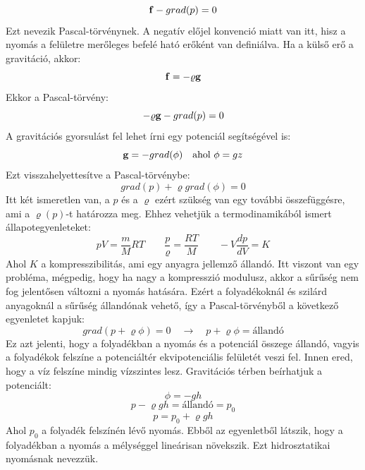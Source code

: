 \documentclass[a4paper,12pt]{article}
\begin{document}
\begin{equation}
    \bold{f} - grad(p) = 0
\end{equation}
Ezt nevezik Pascal-törvénynek. A negatív előjel konvenció miatt van itt, hisz a nyomás a felületre merőleges befelé ható erőként van definiálva.
Ha a külső erő a gravitáció, akkor:
\begin{equation}
    \bold{f} = - \varrho \bold{g}
\end{equation}
Ekkor a Pascal-törvény:
\begin{equation}
    - \varrho \bold{g} - grad(p) = 0
\end{equation}
A gravitációs gyorsulást fel lehet írni egy potenciál segítségével is:
\begin{equation}
    \bold{g} = - grad(\phi) \quad \text{ahol } \phi = gz
\end{equation}
Ezt visszahelyettesítve a Pascal-törvénybe:
\begin{equation}
    grad(p) + \varrho grad(\phi) = 0
\end{equation}
Itt két ismeretlen van, a $p$ és a $\varrho$ ezért szükség van egy további összefüggésre, ami a $\varrho (p)$-t határozza meg.
Ehhez vehetjük a termodinamikából ismert állapotegyenleteket:
\begin{equation}
    pV = \frac{m}{M}RT \quad \quad \frac{p}{\varrho} = \frac{RT}{M} \quad \quad -V \frac{dp}{dV} = K
\end{equation}
Ahol $K$ a kompresszibilitás, ami egy anyagra jellemző állandó. Itt viszont van egy probléma, mégpedig, hogy ha nagy a kompresszió modulusz,
akkor a sűrűség nem fog jelentősen változni a nyomás hatására. Ezért a folyadékoknál és szilárd anyagoknál a sűrűség állandónak vehető,
így a Pascal-törvényből a következő egyenletet kapjuk:
\begin{equation}
    grad(p + \varrho \phi) = 0 \quad \rightarrow \quad p + \varrho \phi = \text{állandó}
\end{equation}
Ez azt jelenti, hogy a folyadékban a nyomás és a potenciál összege állandó, vagyis a folyadékok felszíne a potenciáltér ekvipotenciális felületét veszi fel.
Innen ered, hogy a víz felszíne mindig vízszintes lesz. Gravitációs térben beírhatjuk a potenciált:
\begin{equation}
    \phi = - g h
\end{equation}
\begin{equation}
    p - \varrho g h = \text{állandó} = p_0
\end{equation}
\begin{equation}
    p = p_0 + \varrho g h
\end{equation}
Ahol $p_0$ a folyadék felszínén lévő nyomás. Ebből az egyenletből látszik, hogy a folyadékban a nyomás a mélységgel lineárisan növekszik. Ezt 
hidrosztatikai nyomásnak nevezzük.
\end{document}
